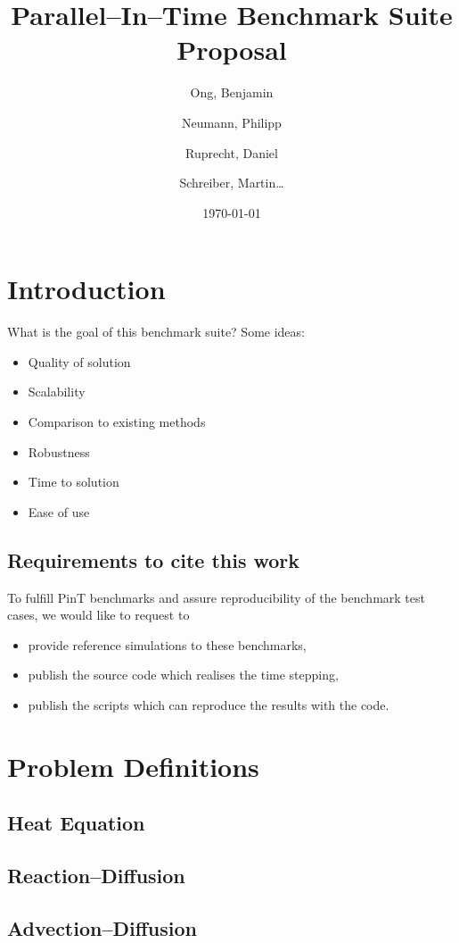 \documentclass[12pt]{article}
\title{Parallel--In--Time Benchmark Suite Proposal}
\author{Ong, Benjamin \and Neumann, Philipp \and Ruprecht, Daniel \and Schreiber, Martin\ldots}
\date{\today}
\begin{document}
\maketitle

\section{Introduction}
What is the goal of this benchmark suite?  Some ideas:
\begin{itemize}
\item Quality of solution
\item Scalability
\item Comparison to existing methods
\item Robustness
\item Time to solution
\item Ease of use
\end{itemize}


\subsection{Requirements to cite this work}
To fulfill PinT benchmarks and assure reproducibility of the benchmark test cases, we would like to request to
\begin{itemize}
	\item provide reference simulations to these benchmarks,
	\item publish the source code which realises the time stepping,
	\item publish the scripts which can reproduce the results with the code.
\end{itemize}


\section{Problem Definitions}

%
%
\subsection{Heat Equation}

\subsection{Reaction--Diffusion}


\subsection{Advection--Diffusion}

\end{document}
